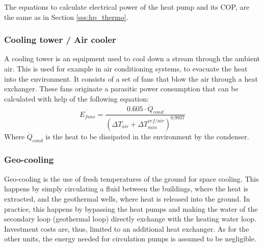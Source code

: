 \documentclass{article}
\begin{document}
The equations to calculate electrical power of the heat pump and its COP, are the same as in Section \ref{sss:hp_thermo}.

\subsubsection{Cooling tower / Air cooler}\label{sss:cooling_tower}
A cooling tower is an equipment used to cool down a stream through the ambient air. This is used for example in air conditioning systems, to evacuate the heat into the environment. It consists of a set of fans that blow the air through a heat exchanger. These fans originate a parasitic power consumption that can be calculated with help of the following equation\cite{henchozPotentialRefrigerantBased}:
\begin{equation}
\dot{E_{fans}} = \frac{0.605 \cdot \dot{Q}_{cond}}{( \Delta T_{air} + \Delta T_{min}^{ref/air})^{0.9937}}
\end{equation}
Where $\dot{Q}_{cond}$ is the heat to be dissipated in the environment by the condenser. 


\subsubsection{Geo-cooling}
Geo-cooling is the use of fresh temperatures of the ground for space cooling. This happens by simply circulating a fluid between the buildings, where the heat is extracted, and the geothermal wells, where heat is released into the ground. In practice, this happens by bypassing the heat pumps and making the water of the secondary loop (geothermal loop) directly exchange with the heating water loop. Investment costs are, thus, limited to an additional heat exchanger. As for the other units, the energy needed for circulation pumps is assumed to be negligible. 
\end{document}
